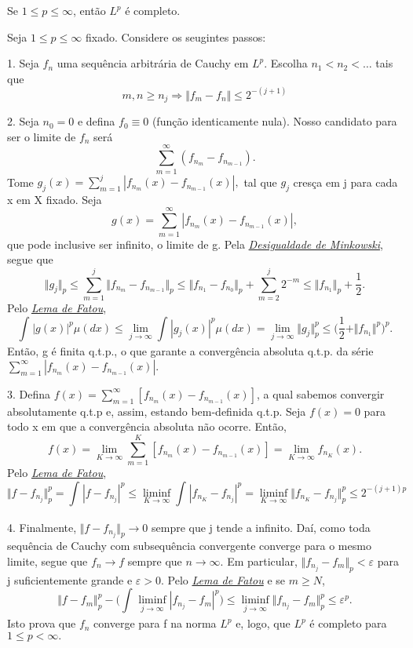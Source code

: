 \documentclass[measure_theory.tex]{subfiles}
\begin{document}
\begin{theorem*}
	Se \(1\leq p\leq \infty\), então \(L^{p}\) é completo.
\end{theorem*}
\begin{proof*}
	Seja \(1\leq p\leq \infty\) fixado. Considere os seugintes passos:

	1. Seja \(f_{n}\) uma sequência arbitrária de Cauchy em \(L^{p}.\) Escolha \(n_1 < n_2 <\dotsc \) tais que
	\[
		m, n\geq n_{j}\Rightarrow \Vert f_{m} - f_{n} \Vert \leq 2^{-(j+1)}
	\]

	2. Seja \(n_{0} = 0\) e defina \(f_{0}\equiv 0\) (função identicamente nula). Nosso candidato para ser o limite de \(f_{n}\) será
	\[
		\sum\limits_{m=1}^{\infty}(f_{n_{m}} - f_{n_{m-1}}).
	\]
	Tome \(g_{j}(x) = \sum\limits_{m=1}^{j}|f_{n_{m}}(x) - f_{n_{m-1}}(x)|,\) tal que \(g_{j}\) cresça em j para cada x em X fixado. Seja
	\[
		g(x) = \sum\limits_{m=1}^{\infty}|f_{n_{m}}(x) - f_{n_{m-1}}(x)|,
	\]
	que pode inclusive ser infinito, o limite de g. Pela \hyperlink{minkowski}{\textit{Desigualdade de Minkowski}}, segue que
	\[
		\Vert g_{j} \Vert_{p}\leq \sum\limits_{m=1}^{j}\Vert f_{n_{m}}-f_{n_{m-1}} \Vert_{p} \leq \Vert f_{n_{1}}-f_{n_{0}} \Vert_{p} + \sum\limits_{m=2}^{j}2^{-m}\leq \Vert f_{n_{1}} \Vert_{p}+\frac{1}{2}.
	\]
	Pelo \hyperlink{fatou}{\textit{Lema de Fatou}},
	\[
		\int_{}^{}|g(x)|^{p}\mu (dx)\leq \lim_{j\to \infty}\int_{}^{}|g_{j}(x)|^{p}\mu (dx) = \lim_{j\to \infty}\Vert g_{j} \Vert_{p}^{p}\leq \biggl(\frac{1}{2}+\Vert f_{n_1} \Vert^{p}\biggr)^{p}.
	\]
	Então, g é finita q.t.p., o que garante a convergência absoluta q.t.p. da série \(\sum\limits_{m=1}^{\infty}|f_{n_{m}}(x) - f_{n_{m-1}}(x)|.\)

	3. Defina \(f(x) = \sum\limits_{m=1}^{\infty}[f_{n_{m}}(x) - f_{n_{m-1}}(x)]\), a qual sabemos convergir absolutamente q.t.p e, assim, estando bem-definida q.t.p. Seja \(f(x) = 0\) para todo x em que a convergência absoluta não ocorre. Então,
	\[
		f(x) = \lim_{K\to \infty}\sum\limits_{m=1}^{K}[f_{n_{m}}(x) - f_{n_{m-1}}(x)] = \lim_{K\to \infty}f_{n_{K}}(x).
	\]
	Pelo \hyperlink{fatou}{\textit{Lema de Fatou}},
	\[
		\Vert f - f_{n_{j}} \Vert_{p}^{p} = \int_{}^{}|f-f_{n_{j}}|^{p}\leq \liminf_{K\to \infty}\int_{}^{}|f_{n_{K}}-f_{n_{j}}|^{p} = \liminf_{K\to \infty}\Vert f_{n_{K}}-f_{n_{j}} \Vert_{p}^{p} \leq 2^{-(j+1)p}
	\]

	4. Finalmente, \(\Vert f - f_{n_{j}} \Vert_{p}\to 0\) sempre que j tende a infinito. Daí, como toda sequência de Cauchy com subsequência convergente converge para o mesmo limite, segue que \(f_{n}\to f\) sempre que \(n\to \infty\).
	Em particular, \(\Vert f_{n_{j}} - f_{m}\Vert_{p}<\varepsilon \) para j suficientemente grande e \(\varepsilon  > 0\). Pelo \hyperlink{fatou}{\textit{Lema de Fatou}} e se \(m\geq N\),
	\[
		\Vert f-f_{m} \Vert_{p}^{p} - \biggl(\int_{}^{}\liminf_{j\to \infty}|f_{n_{j}}-f_{m}|^{p}\biggr) \leq \liminf_{j\to \infty}\Vert f_{n_{j}}-f_{m} \Vert_{p}^{p}\leq \varepsilon^{p}.
	\]
	Isto prova que \(f_{n}\) converge para f na norma \(L^{p}\) e, logo, que \(L^{p}\) é completo para \(1\leq p < \infty.\)



\end{proof*}
\end{document}
